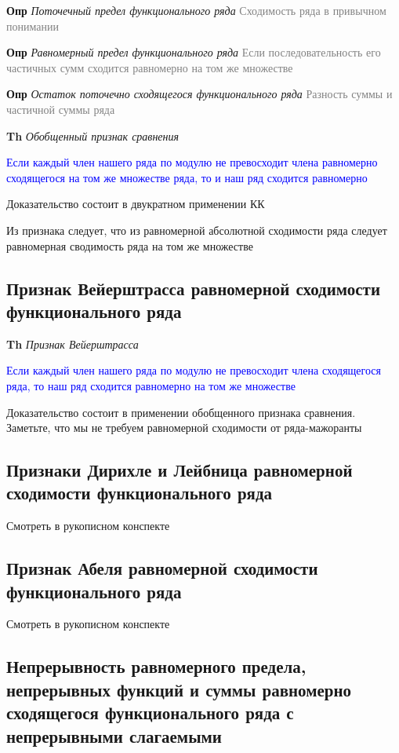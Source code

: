 \textbf{Опр} \textit{Поточечный предел функционального ряда} \textcolor{gray}{Сходимость ряда в привычном понимании}

\textbf{Опр} \textit{Равномерный предел функционального ряда} \textcolor{gray}{Если последовательность его
частичных сумм сходится равномерно на том же множестве}

\textbf{Опр} \textit{Остаток поточечно сходящегося функционального ряда} \textcolor{gray}{Разность суммы и
частичной суммы ряда}

\textbf{Th} \textit{Обобщенный признак сравнения}

\textcolor{blue}{Если каждый член нашего ряда по модулю не превосходит члена равномерно сходящегося на том же
множестве ряда, то и наш ряд сходится равномерно}

Доказательство состоит в двукратном применении КК

Из признака следует, что из равномерной абсолютной сходимости ряда следует равномерная сводимость ряда на том же
множестве

\subsection{Признак Вейерштрасса равномерной сходимости функционального ряда}

\textbf{Th} \textit{Признак Вейерштрасса}

\textcolor{blue}{Если каждый член нашего ряда по модулю не превосходит члена сходящегося ряда, то наш ряд
сходится равномерно на том же множестве}

Доказательство состоит в применении обобщенного признака сравнения.
Заметьте, что мы не требуем равномерной сходимости от ряда-мажоранты

\subsection{Признаки Дирихле и Лейбница равномерной сходимости функционального ряда}

Смотреть в рукописном конспекте

\subsection{Признак Абеля равномерной сходимости функционального ряда}

Смотреть в рукописном конспекте

\subsection{Непрерывность равномерного предела, непрерывных функций и суммы равномерно сходящегося функционального ряда с
непрерывными слагаемыми}

